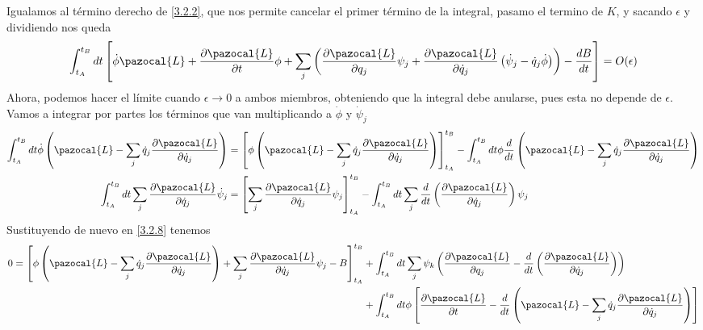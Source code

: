 Igualamos al término derecho de \eqref{3.2.2}, que nos permite cancelar el primer término de la integral, pasamo el termino de $K$, y sacando $\epsilon$ y dividiendo nos queda
\begin{equation} \label{3.2.8}
    \int_{t_A}^{t_B} dt\left[\dot{\phi}\pazocal{L} +\frac{\partial \pazocal{L}}{\partial t}\phi +\sum_j \left(\frac{\partial \pazocal{L}}{\partial q_j} \psi_j + \frac{\partial \pazocal{L}}{\partial \dot{q}_j} \left(\dot{\psi}_j-\dot{q}_j \dot{\phi}\right)\right)- \frac{dB}{dt}\right] = O(\epsilon)
\end{equation} 
Ahora, podemos hacer el límite cuando $\epsilon \rightarrow 0$ a ambos miembros, obteniendo que la integral debe anularse, pues esta no depende de $\epsilon$. Vamos a integrar por partes los términos que van multiplicando a $\dot{\phi}$ y $\dot{\psi}_j$
\begin{equation} \label{3.2.9}
    \begin{split}
        \int_{t_A}^{t_B} dt \dot{\phi}\left(\pazocal{L}-\sum_j \dot{q}_j\frac{\partial \pazocal{L}}{\partial \dot{q}_j}\right) & = \left[\phi \left(\pazocal{L}-\sum_j \dot{q}_j\frac{\partial \pazocal{L}}{\partial \dot{q}_j}\right) \right]_{t_A}^{t_B} - \int_{t_A}^{t_B} dt \phi \frac{d}{dt}\left(\pazocal{L}-\sum_j \dot{q}_j\frac{\partial \pazocal{L}}{\partial \dot{q}_j}\right) \\ 
        \int_{t_A}^{t_B} dt \sum_j \frac{\partial \pazocal{L}}{\partial \dot{q}_j} \dot{\psi}_j & = \left[\sum_j \frac{\partial \pazocal{L}}{\partial \dot{q}_j} \psi_j\right]_{t_A}^{t_B} - \int_{t_A}^{t_B} dt \sum_j \frac{d}{dt}\left(\frac{\partial \pazocal{L}}{\partial \dot{q}_j}\right) \psi_j
    \end{split}  
\end{equation} 
Sustituyendo de nuevo en \eqref{3.2.8} tenemos
\begin{equation} \label{3.2.10}
    \begin{split}
        0 =  \left[ \phi \left(\pazocal{L}-\sum_j \dot{q}_j\frac{\partial \pazocal{L}}{\partial \dot{q}_j}\right) +\sum_j \frac{\partial \pazocal{L}}{\partial \dot{q}_j} \psi_j - B\right]_{t_A}^{t_B} & +  \int_{t_A}^{t_B} dt \sum_j \psi_k \left(\frac{\partial \pazocal{L}}{\partial q_j}-\frac{d}{dt}\left(\frac{\partial \pazocal{L}}{\partial \dot{q}_j}\right)\right) \\ 
        &+\int_{t_A}^{t_B} dt \phi\left[\frac{\partial \pazocal{L}}{\partial t} -\frac{d}{dt}\left(\pazocal{L}-\sum_j \dot{q}_j\frac{\partial \pazocal{L}}{\partial \dot{q}_j}\right)\right]
    \end{split} 
\end{equation} 
